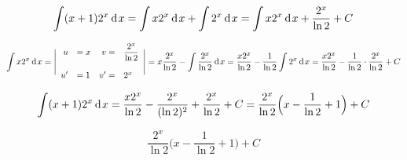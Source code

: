 {}

$$
  \int (x+1)2^x\hspace{2pt}\text{d}\hspace{1pt}{x} =  \int x2^x\hspace{2pt}\text{d}\hspace{1pt}{x} + \int 2^x\hspace{2pt}\text{d}\hspace{1pt}{x} = \int x2^x\hspace{2pt}\text{d}\hspace{1pt}{x} + \dfrac{2^x}{\ln{2}} + C
$$

$$
\int x2^x\hspace{2pt}\text{d}\hspace{1pt}{x}
= \Bigg |
  \begin{array}{rlrl}
    u  &= x & v =& \dfrac{2^x}{\ln{2}} \\
    \\
    u' &= 1 & v'=& 2^x \\
  \end{array}
\Bigg |
= x \dfrac{2^x}{\ln{2}} - \int \dfrac{2^x}{\ln{2}}\hspace{2pt}\text{d}\hspace{1pt}{x}
= \dfrac{x2^x}{\ln{2}} - \dfrac{1}{\ln{2}}\int  2^x\hspace{2pt}\text{d}\hspace{1pt}{x}
= \dfrac{x2^x}{\ln{2}} - \dfrac{1}{\ln{2}} \cdot \dfrac{2^x}{\ln{2}} + C
$$


$$
  \int (x+1)2^x\hspace{2pt}\text{d}\hspace{1pt}{x}  = \dfrac{x2^x}{\ln{2}} - \dfrac{2^x}{(\ln{2})^2} + \dfrac{2^x}{\ln{2}} + C = \dfrac{2^x}{\ln{2}} \Big( x - \dfrac{1}{\ln2}+1 \Big) + C
$$


$$\boxed{ \dfrac{2^x}{\ln{2}} \Big( x - \dfrac{1}{\ln2}+1 \Big) + C }$$
